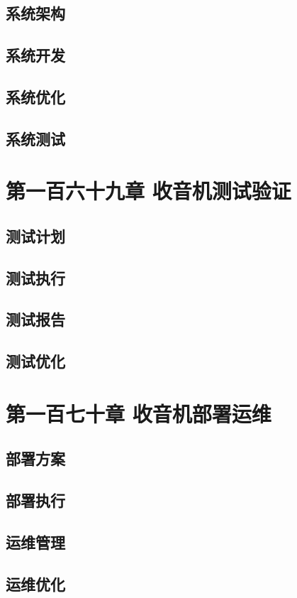 \documentclass[12pt,UTF8]{ctexbook}
\begin{document}
\section{系统架构}
\section{系统开发}
\section{系统优化}
\section{系统测试}

\chapter{第一百六十九章 收音机测试验证}

\section{测试计划}
\section{测试执行}
\section{测试报告}
\section{测试优化}

\chapter{第一百七十章 收音机部署运维}

\section{部署方案}
\section{部署执行}
\section{运维管理}
\section{运维优化}
\end{document}
